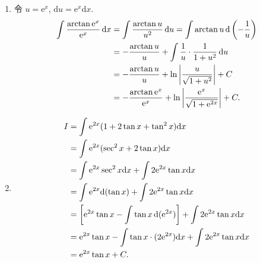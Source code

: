 \begin{solution}
\begin{enumerate}
        \item 令 $u = \mathrm{e}^x$, $\mathrm{d}u = \mathrm{e}^x \mathrm{d}x$.
              \begin{align*}
                  \int \frac{\arctan \mathrm{e}^x}{\mathrm{e}^x} \operatorname{d\!} x &= \int \frac{\arctan u}{u^2} \operatorname{d\!} u = \int \arctan u \operatorname{d}\left(-\frac{1}{u}\right) \\
                                                       & = -\frac{\arctan u}{u} + \int \frac{1}{u} \cdot \frac{1}{1 + u^2} \operatorname{d\!} u\\
                                                       &= - \frac{\arctan u}{u} + \ln \left| \frac{u}{\sqrt{1 + u^2}} \right| + C \\
                                                       & = - \frac{\arctan \mathrm{e}^x}{\mathrm{e}^x} + \ln \left| \frac{\mathrm{e}^x}{\sqrt{1 + \mathrm{e}^{2x}}} \right| + C.
              \end{align*}

        \item \begin{align*}
                  I & = \int \mathrm{e}^{2x} (1 + 2\tan x + \tan^2 x) \mathrm{d}x                                                              \\
                    & = \int \mathrm{e}^{2x} (\sec^2 x + 2\tan x) \mathrm{d}x                                                                  \\
                    & = \int \mathrm{e}^{2x} \sec^2 x \mathrm{d}x + \int 2 \mathrm{e}^{2x} \tan x \mathrm{d}x                                  \\
                    & = \int \mathrm{e}^{2x} \mathrm{d}(\tan x) + \int 2 \mathrm{e}^{2x} \tan x \mathrm{d}x                                    \\
                    & = \left[ \mathrm{e}^{2x} \tan x - \int \tan x \operatorname{d}(\mathrm{e}^{2x}) \right] + \int 2 \mathrm{e}^{2x} \tan x \mathrm{d}x \\
                    & = \mathrm{e}^{2x} \tan x - \int \tan x \cdot (2 \mathrm{e}^{2x}) \mathrm{d}x + \int 2 \mathrm{e}^{2x} \tan x \mathrm{d}x \\
                    & = \mathrm{e}^{2x} \tan x + C.
              \end{align*}


\end{enumerate}
\end{solution}
